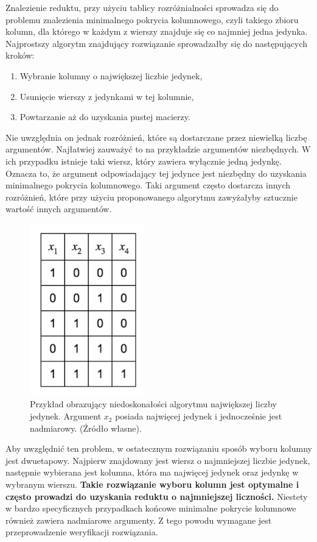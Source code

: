 Znalezienie reduktu,
przy użyciu tablicy rozróżnialności sprowadza się do problemu znalezienia minimalnego pokrycia kolumnowego,
czyli takiego zbioru kolumn,
dla którego w każdym z wierszy znajduje się co najmniej jedna jedynka.
Najprostszy algorytm znajdujący rozwiązanie sprowadzałby się do następujących kroków:
\begin{enumerate}
\item Wybranie kolumny o największej liczbie jedynek,
\item Usunięcie wierszy z jedynkami w tej kolumnie,
\item Powtarzanie aż do uzyskania pustej macierzy.
\end{enumerate}
Nie uwzględnia on jednak rozróżnień,
które są dostarczane przez niewielką liczbę argumentów.
Najłatwiej zauważyć to na przykładzie argumentów niezbędnych.
W ich przypadku istnieje taki wiersz,
który zawiera wyłącznie jedną jedynkę.
Oznacza to,
że argument odpowiadający tej jedynce jest niezbędny do uzyskania minimalnego pokrycia kolumnowego.
Taki argument często dostarcza innych rozróżnień,
które przy użyciu proponowanego algorytmu zawyżałyby sztucznie wartość innych argumentów.

\begin{figure}[H]
\centering
\includegraphics[width = 5cm]{chapter02/required-arguments.png}
\caption{Przykład obrazujący niedoskonałości algorytmu największej liczby jedynek. Argument $x_2$ posiada najwięcej jedynek i jednocześnie jest nadmiarowy. (Źródło własne).}
\end{figure}

Aby uwzględnić ten problem,
w ostatecznym rozwiązaniu sposób wyboru kolumny jest dwuetapowy.
Najpierw znajdowany jest wiersz o najmniejszej liczbie jedynek,
następnie wybierana jest kolumna,
która ma najwięcej jedynek oraz jedynkę w wybranym wierszu.
\textbf{Takie rozwiązanie wyboru kolumn jest optymalne i często prowadzi do uzyskania reduktu o najmniejszej liczności.}%
Niestety w bardzo specyficznych przypadkach końcowe minimalne pokrycie kolumnowe również zawiera nadmiarowe argumenty.
Z tego powodu wymagane jest przeprowadzenie weryfikacji rozwiązania.


